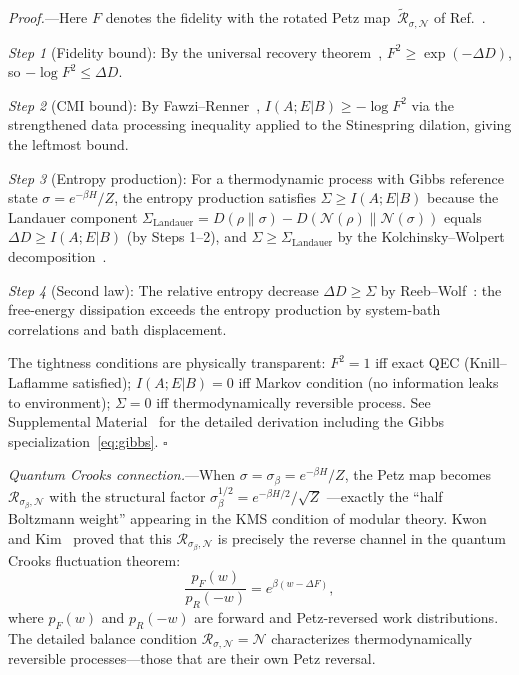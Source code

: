 \documentclass[prl,twocolumn,superscriptaddress,longbibliography,floatfix]{revtex4-2}
\newcommand{\Petz}{\mathcal{R}}
\newcommand{\chan}{\mathcal{N}}
\begin{document}
\emph{Proof.}---Here $F$ denotes the fidelity with the rotated
Petz map~$\tilde{\Petz}_{\sigma,\chan}$ of
Ref.~\cite{Junge2018}.

\emph{Step 1} (Fidelity bound): By the universal recovery
theorem~\cite{Junge2018},
$F^2 \geq \exp(-\Delta D)$, so $-\log F^2 \leq \Delta D$.

\emph{Step 2} (CMI bound): By Fawzi--Renner~\cite{Fawzi2015},
$I(A;E|B) \geq -\log F^2$ via the strengthened data processing
inequality applied to the Stinespring dilation, giving the leftmost
bound.

\emph{Step 3} (Entropy production): For a thermodynamic process
with Gibbs reference state $\sigma = e^{-\beta H}/Z$, the entropy
production satisfies $\Sigma \geq I(A;E|B)$ because the Landauer
component $\Sigma_{\mathrm{Landauer}} = D(\rho\|\sigma) -
D(\chan(\rho)\|\chan(\sigma))$ equals $\Delta D \geq I(A;E|B)$
(by Steps 1--2), and $\Sigma \geq \Sigma_{\mathrm{Landauer}}$
by the Kolchinsky--Wolpert
decomposition~\cite{Kolchinsky2017}.

\emph{Step 4} (Second law): The relative entropy decrease
$\Delta D \geq \Sigma$ by Reeb--Wolf~\cite{ReebWolf2014}:
the free-energy dissipation exceeds the entropy production by
system-bath correlations and bath displacement.

The tightness conditions are physically transparent:
$F^2 = 1$ iff exact QEC (Knill--Laflamme satisfied);
$I(A;E|B) = 0$ iff Markov condition (no information leaks to
environment); $\Sigma = 0$ iff thermodynamically reversible process.
See Supplemental Material~\cite{SM} for the detailed derivation
including the Gibbs specialization~\eqref{eq:gibbs}. \hfill$\square$

\emph{Quantum Crooks connection.}---When $\sigma = \sigma_\beta =
e^{-\beta H}/Z$, the Petz map becomes $\Petz_{\sigma_\beta,\chan}$
with the structural factor $\sigma_\beta^{1/2} = e^{-\beta H/2}/\sqrt{Z}$
---exactly the ``half Boltzmann weight'' appearing in the KMS condition
of modular theory. Kwon and Kim~\cite{Kwon2019} proved that this
$\Petz_{\sigma_\beta,\chan}$ is precisely the reverse channel in the
quantum Crooks fluctuation theorem:
\begin{equation}
\frac{p_F(w)}{p_R(-w)} = e^{\beta(w - \Delta F)},
\label{eq:crooks}
\end{equation}
where $p_F(w)$ and $p_R(-w)$ are forward and Petz-reversed work
distributions. The detailed balance condition
$\Petz_{\sigma,\chan} = \chan$ characterizes thermodynamically
reversible processes---those that are their own Petz reversal.
\end{document}
